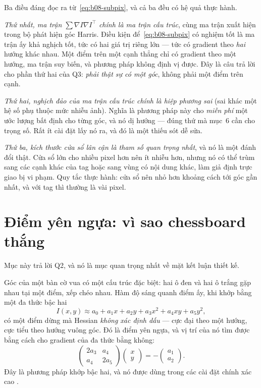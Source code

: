 \documentclass[../../marker.tex]{subfiles}
\begin{document}
Ba điều đáng đọc ra từ~\eqref{eq:b08-subpix}, và cả ba đều có hệ quả thực hành.

\emph{Thứ nhất, ma trận \(\sum \nabla I \nabla I^\top\) chính là ma trận cấu trúc}, cùng ma trận xuất hiện trong bộ phát hiện góc Harris. Điều kiện để~\eqref{eq:b08-subpix} có nghiệm tốt là ma trận ấy khả nghịch tốt, tức có hai giá trị riêng lớn --- tức có gradient theo \emph{hai} hướng khác nhau. Một điểm trên một cạnh thẳng chỉ có gradient theo một hướng, ma trận suy biến, và phương pháp không định vị được. Đây là câu trả lời cho phần thứ hai của Q3: \emph{phải thật sự có một góc}, không phải một điểm trên cạnh.

\emph{Thứ hai, nghịch đảo của ma trận cấu trúc chính là hiệp phương sai} (sai khác một hệ số phụ thuộc mức nhiễu ảnh). Nghĩa là phương pháp này cho \emph{miễn phí} một ước lượng bất định cho từng góc, và nó dị hướng --- đúng thứ mà  mục~6 cần cho trọng số. Rất ít cài đặt lấy nó ra, và đó là một thiếu sót dễ sửa.

\emph{Thứ ba, kích thước cửa sổ lân cận là tham số quan trọng nhất}, và nó là một đánh đổi thật. Cửa sổ lớn cho nhiều pixel hơn nên ít nhiễu hơn, nhưng nó có thể trùm sang các cạnh khác của tag hoặc sang vùng có nội dung khác, làm giả định trực giao bị vi phạm. Quy tắc thực hành: cửa sổ nên nhỏ hơn khoảng cách tới góc gần nhất, và với tag thì thường là vài pixel.

\section{Điểm yên ngựa: vì sao chessboard thắng}

Mục này trả lời Q2, và nó là mục quan trọng nhất về mặt kết luận thiết kế.

Góc của một bàn cờ vua có một cấu trúc đặc biệt: hai ô đen và hai ô trắng gặp nhau tại một điểm, xếp chéo nhau. Hàm độ sáng quanh điểm ấy, khi khớp bằng một đa thức bậc hai
\[
I(x,y) \approx a_0 + a_1 x + a_2 y + a_3 x^2 + a_4 xy + a_5 y^2,
\]
có một điểm dừng mà Hessian \emph{không xác định dấu} --- cực đại theo một hướng, cực tiểu theo hướng vuông góc. Đó là điểm yên ngựa, và vị trí của nó tìm được bằng cách cho gradient của đa thức bằng không:
\[
\begin{pmatrix} 2a_3 & a_4 \\ a_4 & 2a_5 \end{pmatrix}
\begin{pmatrix} x \\ y \end{pmatrix} = -\begin{pmatrix} a_1 \\ a_2 \end{pmatrix}.
\]
Đây là phương pháp khớp bậc hai, và nó được dùng trong các cài đặt chính xác cao \cite{lucchese2002using,chen2018deltille}.
\end{document}
